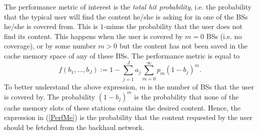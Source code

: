 \documentclass[conference,twocolum,final]{IEEEtran}
\begin{document}
The performance metric of interest is the \textit{total hit probability}, i.e. the probability that the typical user will find the content he/she is asking for in one of the BSs he/she is covered from. This is $1$-minus the probability that the user does not find its content. This happens when the user is covered by $m=0$ BSs (i.e. no coverage), or by some number $m>0$ but the content has not been saved in the cache memory space of any of these BSs. The performance metric is equal to
\begin{equation}
\label{PerfMe}
f\left(b_1,\ldots,b_J\right) := 1-\sum_{j=1}^{J}a_j  \sum_{m=0}^{\infty} p_m\left(1-b_j\right)^{m}.
\end{equation}
To better understand the above expression, $m$ is the number of BSs that the user is covered by. The probability $\left(1-b_j\right)^{m}$ is the probability that none of the cache memory slots of these stations contains the desired content. Hence, the expression in (\ref{PerfMe}) is the probability that the content requested by the user should be fetched from the backhaul network.
\end{document}
